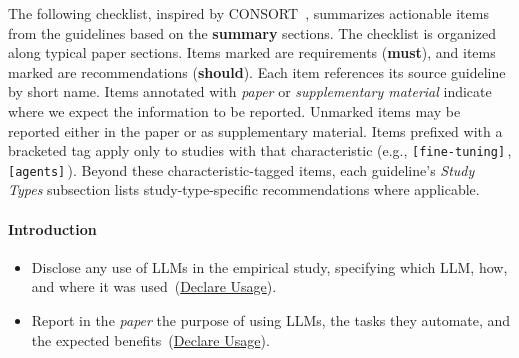 \documentclass[smallextended]{svjour3}
\makeatletter
\newif\ifpaper\papertrue
\newcommand{\must}{\textbf{must}\xspace}
\newcommand{\should}{\textbf{should}\xspace}
\newcommand{\paper}{\emph{paper}\xspace}
\newcommand{\supplementarymaterial}{\emph{supplementary material}\xspace}
\newcommand{\paper}{\emph{paper}\xspace}
\newcommand{\supplementarymaterial}{\emph{supplementary material}\xspace}
\newcommand{\iconM}{\usebox{\iconMbox}\xspace}
\newcommand{\iconS}{\usebox{\iconSbox}\xspace}
\newcommand{\iconM}{●\xspace}
\newcommand{\iconS}{○\xspace}
\newcommand{\condition}[1]{\texttt{\small[#1]}\,}
\newcommand{\condition}[1]{@@cond:#1@@}
\newcommand{\refdeclareusage}{\hyperref[sec:declare-llm-usage-and-role]{Declare Usage}}
\newcommand{\refdeclareusage}{\href{/guidelines/declare-llm-usage-and-role/}{Declare Usage}}
\makeatother
\begin{document}
\begin{appendices}
The following checklist, inspired by CONSORT~\citep{Schulz2010}, summarizes actionable items from the guidelines based on the \textbf{summary} sections.
The checklist is organized along typical paper sections.
Items marked \iconM are requirements (\must), and items marked \iconS are recommendations (\should).
Each item references its source guideline by short name.
Items annotated with \paper or \supplementarymaterial indicate where we expect the information to be reported.
Unmarked items may be reported either in the paper or as supplementary material.
Items prefixed with a bracketed tag apply only to studies with that characteristic (e.g., \condition{fine-tuning}, \condition{agents}).\ifpaper\else{} Readers can hover each tag to read its description and use the filter panel to hide items that do not apply to their study.\fi
Beyond these characteristic-tagged items, each guideline's \emph{Study Types} subsection lists study-type-specific recommendations where applicable.

\paragraph{\textbf{Introduction}}
\begin{itemize}[label={},leftmargin=*]
    \item \iconM Disclose any use of LLMs in the empirical study, specifying which LLM, how, and where it was used~(\refdeclareusage).
    \item \iconS Report in the \paper the purpose of using LLMs, the tasks they automate, and the expected benefits~(\refdeclareusage).
\end{itemize}


\end{appendices}
\end{document}

